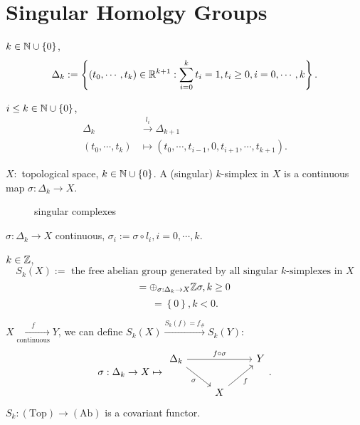 \section{Singular Homolgy Groups}
\begin{definition}
  $k\in \mathbb{N} \cup \left\{0\right\} $, 
  \[
    \Delta_k :=\left\{(t_0,\cdots,t_k)\in \mathbb{R}^{k+1}: \sum_{i=0}^{k} t_i=1,t_i\ge 0,i=0,\cdots,k\right\} .
  \]
\end{definition}
\begin{definition}
  $i\le k \in \mathbb{N} \cup \left\{0\right\} $,
  \begin{align*}
    \Delta_{k}&\xrightarrow{l_i}\Delta_{k+1}\\
    (t_0,\cdots,t_k)&\mapsto \left( t_0,\cdots,t_{i-1},0,t_{i+1},\cdots,t_{k+1} \right). 
  \end{align*} 
\end{definition}
\begin{definition}
  $X:$ topological space, $k\in \mathbb{N}\cup \left\{0\right\} $. A (singular) $k$-simplex in $X$ is 
  a continuous map $\sigma :\Delta_k\to X$.
\begin{figure}[ht]
    \centering
    \caption{singular complexes}
    \label{fig:singular-complexes}
\end{figure}
\end{definition}
\begin{definition}
  $\sigma:\Delta_k\to X$ continuous, $\sigma_i:=\sigma\circ l_i,i=0,\cdots,k.$
\end{definition}
\begin{definition}
  $k\in \mathbb{Z}$, 
  \[
    S_k(X):= \text{ the free abelian group generated by all singular } k\text{-simplexes in }X
  \] 
  \[
  =\oplus_{\sigma:\Delta_k\to X }\mathbb{Z}{\sigma}, k\ge 0
  \] 
  \[
  =\left\{0\right\} ,k<0.
  \] 
\end{definition}
$X\xrightarrow[\text{continuous}]{f}Y$, we can define $S_k(X)\xrightarrow{S_k(f)=f_{\#}}S_k(Y)$:
\[
\sigma:\Delta_k\to X \mapsto 
\begin{tikzcd}
  \Delta_k\arrow{rr}{f\circ\sigma} \arrow[swap]{rd}{\sigma} & & Y\\
   & X  \arrow[swap]{ru}{f}& 
\end{tikzcd}
.\] 
$S_k:(\text{Top})\rightarrow (\text{Ab})$ is a covariant functor.

